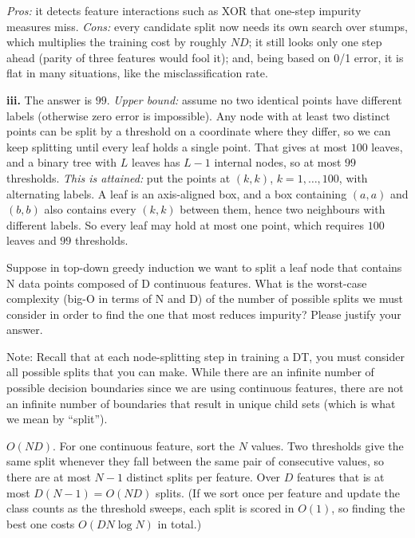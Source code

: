 \documentclass{article}
\begin{document}
\begin{solution}
\emph{Pros:} it detects feature interactions such as XOR that one-step impurity measures miss.
\emph{Cons:} every candidate split now needs its own search over stumps, which multiplies the training cost by roughly $ND$; it still
looks only one step ahead (parity of three features would fool it); and, being based on 0/1 error, it is flat in many situations, like the misclassification rate.

\textbf{iii.} The answer is $99$. \emph{Upper bound:} assume no two identical points have different labels (otherwise zero error is impossible). Any node with at least two distinct points can be split
by a threshold on a coordinate where they differ, so we can keep splitting until every leaf holds a single point. That gives at most $100$ leaves, and a binary tree with $L$ leaves has $L-1$ internal nodes, so at most $99$ thresholds.
\emph{This is attained:} put the points at $(k,k)$, $k=1,\dots,100$, with alternating labels. A leaf is an axis-aligned box, and a box containing $(a,a)$ and $(b,b)$ also contains every $(k,k)$ between them, hence two neighbours with different labels.
So every leaf may hold at most one point, which requires $100$ leaves and $99$ thresholds.
\end{solution}

\problem[4] Suppose in top-down greedy induction we want to split a leaf node that contains N data points composed of
D continuous features. What is the worst-case
complexity (big-O in terms of N and D) of the number of possible splits we must consider in order to find the one that most reduces impurity? Please justify your answer.

Note: Recall that at each node-splitting step in training a DT, you must consider all possible splits that you can make. While there are an infinite number of possible decision boundaries since we are using continuous features, there are not an infinite number of boundaries that result in unique child sets (which is what we mean by ``split'').



\begin{solution}
\upshape
$O(ND)$. For one continuous feature, sort the $N$ values. Two thresholds give the same split whenever they fall between the same pair of consecutive values, so there are at most $N-1$ distinct splits per feature.
Over $D$ features that is at most $D(N-1)=O(ND)$ splits. (If we sort once per feature and update the class counts as the threshold sweeps, each split is scored in $O(1)$, so finding the best one costs $O(DN\log N)$ in total.)
\end{solution}
\end{document}
